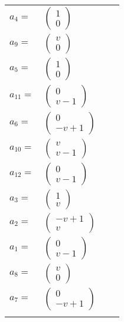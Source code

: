 \documentclass[1p]{elsarticle_modified}
\theoremstyle{definition}
\begin{document}
\begin{tabular}{m{7pt} m{180pt} m{7pt} m{180pt} }
\flushright $a_{4}=$&$\begin{pmatrix}1\\0\end{pmatrix}$ \\
\flushright $a_{9}=$&$\begin{pmatrix}v\\0\end{pmatrix}$ \\
\flushright $a_{5}=$&$\begin{pmatrix}1\\0\end{pmatrix}$ \\
\flushright $a_{11}=$&$\begin{pmatrix}0\\v-1\end{pmatrix}$ \\
\flushright $a_{6}=$&$\begin{pmatrix}0\\- v+1\end{pmatrix}$ \\
\flushright $a_{10}=$&$\begin{pmatrix}v\\v-1\end{pmatrix}$ \\
\flushright $a_{12}=$&$\begin{pmatrix}0\\v-1\end{pmatrix}$ \\
\flushright $a_{3}=$&$\begin{pmatrix}1\\v\end{pmatrix}$ \\
\flushright $a_{2}=$&$\begin{pmatrix}- v+1\\v\end{pmatrix}$ \\
\flushright $a_{1}=$&$\begin{pmatrix}0\\v-1\end{pmatrix}$ \\
\flushright $a_{8}=$&$\begin{pmatrix}v\\0\end{pmatrix}$ \\
\flushright $a_{7}=$&$\begin{pmatrix}0\\- v+1\end{pmatrix}$\\&\end{tabular}
\end{document}
